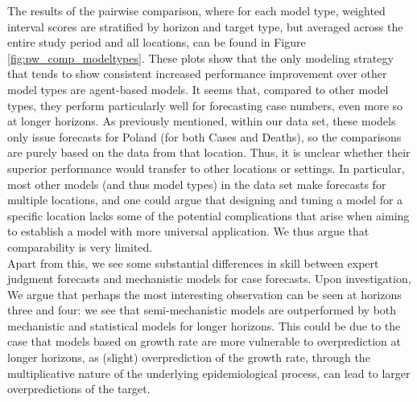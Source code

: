 The results of the pairwise comparison, where for each model type, weighted interval scores are stratified by horizon and target type, but averaged across the entire study period and all locations, can be found in Figure \ref{fig:pw_comp_modeltypes}. These plots show that the only modeling strategy that tends to show consistent increased performance improvement over other model types are agent-based models. It seems that, compared to other model types, they perform particularly well for forecasting case numbers, even more so at longer horizons. As previously mentioned, within our data set, these models only issue forecasts for Poland (for both Cases and Deaths), so the comparisons are purely based on the data from that location. Thus, it is unclear whether their superior performance would transfer to other locations or settings. In particular, most other models (and thus model types) in the data set make forecasts for multiple locations, and one could argue that designing and tuning a model for a specific location lacks some of the potential complications that arise when aiming to establish a model with more universal application. We thus argue that comparability is very limited.\\
Apart from this, we see some substantial differences in skill between expert judgment forecasts and mechanistic models for case forecasts. Upon investigation,  \\
We argue that perhaps the most interesting observation can be seen at horizons three and four: we see that semi-mechanistic models are outperformed by both mechanistic and statistical models for longer horizons. This could be due to the case that models based on growth rate are more vulnerable to overprediction at longer horizons, as (slight) overprediction of the growth rate, through the multiplicative nature of the underlying epidemiological process, can lead to larger overpredictions of the target. \\
